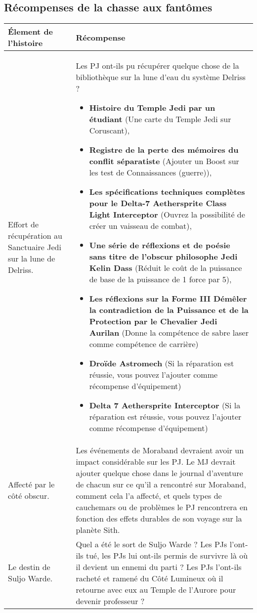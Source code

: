 \documentclass[twoside]{article}
\begin{document}
\subsection{Récompenses de la chasse aux fantômes}
\renewcommand{\arraystretch}{1.4}
\begin{tabular}{|p{4cm}|p{12cm}|}
	\hline 
	\cellcolor{DarkRed} {\large \textcolor{PureWhite}{\textbf{Élement de l'histoire}}} & \cellcolor{DarkRed} {\large \textcolor{PureWhite}{\textbf{Récompense}}} \\ 
	\hline 
	Effort de récupération au Sanctuaire Jedi sur la lune de Delriss. & Les PJ ont-ils pu récupérer quelque chose de la bibliothèque sur la lune d'eau du système Delriss ? 
	\begin{itemize}
		\item \textbf{Histoire du Temple Jedi par un étudiant} (Une carte du Temple Jedi sur Coruscant),
		\item \textbf{Registre de la perte des mémoires du conflit séparatiste} (Ajouter un Boost sur les test de Connaissances (guerre)),
		\item \textbf{Les spécifications techniques complètes pour le Delta-7 Aethersprite Class Light Interceptor} (Ouvrez la possibilité de créer un vaisseau de combat),
		\item \textbf{Une série de réflexions et de poésie sans titre de l'obscur philosophe Jedi Kelin Dass} (Réduit le coût de la puissance de base de la puissance de 1 force par 5),
		\item \textbf{Les réflexions sur la Forme III Démêler la contradiction de la Puissance et de la Protection par le Chevalier Jedi Aurilan} (Donne la compétence de sabre laser comme compétence de carrière)
		\item \textbf{Droïde Astromech} (Si la réparation est réussie, vous pouvez l'ajouter comme récompense d'équipement)
		\item \textbf{Delta 7 Aethersprite Interceptor} (Si la réparation est réussie, vous pouvez l'ajouter comme récompense d'équipement)
	\end{itemize}
	\\ 
	\hline 
	Affecté par le côté obscur. & Les événements de Moraband devraient avoir un impact considérable sur les PJ. Le MJ devrait ajouter quelque chose dans le journal d'aventure de chacun sur ce qu'il a rencontré sur Moraband, comment cela l'a affecté, et quels types de cauchemars ou de problèmes le PJ rencontrera en fonction des effets durables de son voyage sur la planète Sith. \\ 
	\hline 
	Le destin de Suljo Warde. & Quel a été le sort de Suljo Warde ?  Les PJs l'ont-ils tué, les PJs lui ont-ils permis de survivre là où il devient un ennemi du parti ?  Les PJs l'ont-ils racheté et ramené du Côté Lumineux où il retourne avec eux au Temple de l'Aurore pour devenir professeur ? \\ 
	\hline 
\end{tabular} 
\end{document}
